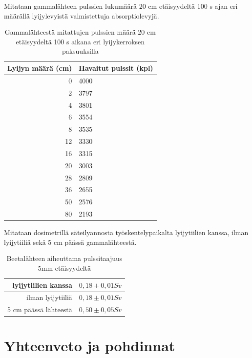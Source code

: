 \documentclass[a4paper,11pt]{article}
\begin{document}
\clearpage

Mitataan gammalähteen pulssien lukumäärä 20 cm etäisyydeltä 100 s ajan eri määrällä lyijylevyistä valmistettuja absorptiolevyjä. 

\begin{table}[ht]
\begin{center}
\caption{Gammalähteestä mitattujen pulssien määrä 20 cm etäisyydeltä 100 s aikana eri lyijykerroksen paksuuksilla}
\begin{tabular}{ | r | l | }
  \hline
Lyijyn määrä (cm) & Havaitut pulssit (kpl) \\ \hline
0 & 4000 \\ \hline
2 & 3797 \\ \hline
4 & 3801 \\ \hline
6 & 3554 \\ \hline
8 & 3535 \\ \hline
12 & 3330 \\ \hline
16 & 3315 \\ \hline
20 & 3003 \\ \hline
28 & 2809 \\ \hline
36 & 2655 \\ \hline
50 & 2576 \\ \hline
80 & 2193 \\ \hline

\end{tabular}
\end{center}
\end{table}

Mitataan dosimetrillä säteilyannosta työskentelypaikalta lyijytiilien kanssa, ilman lyijytiiliä sekä 5 cm päässä gammalähteestä. 

\begin{table}[ht]
\begin{center}
\caption{Beetalähteen aiheuttama pulssitaajuus 5mm etäisyydeltä}
\begin{tabular}{ | r | l | }
  \hline
  lyijytiilien kanssa & $0,18 \pm 0,01 Sv$ \\ \hline
  ilman lyijytiiliä & $0,18 \pm 0,01 Sv$ \\ \hline
  5 cm päässä lähteestä & $0,50 \pm 0,05 Sv$ \\ \hline
\end{tabular}
\end{center}
\end{table}

\clearpage

\section{Yhteenveto ja pohdinnat}
\end{document}
